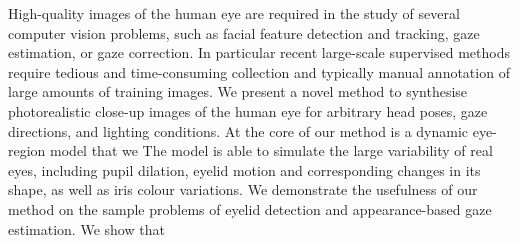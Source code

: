 
High-quality images of the human eye are required in the study of several computer vision problems, such as facial feature detection and tracking, gaze estimation, or gaze correction.
In particular recent large-scale supervised methods require tedious and time-consuming collection and typically manual annotation of large amounts of training images.
We present a novel method to synthesise photorealistic close-up images of the human eye for arbitrary head poses, gaze directions, and lighting conditions.
At the core of our method is a dynamic eye-region model that we 
The model is able to simulate the large variability of real eyes, including pupil dilation, eyelid motion and corresponding changes in its shape, as well as iris colour variations.
We demonstrate the usefulness of our method on the sample problems of eyelid detection and appearance-based gaze estimation.
We show that 